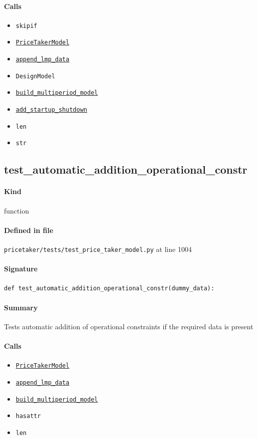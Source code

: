 \documentclass[11pt]{report}
\begin{document}
\paragraph{Calls}
\begin{itemize}[leftmargin=*]
  \item \texttt{skipif}
  \item \hyperref[def:pricetaker-price_taker_model.py:PriceTakerModel:L161]{\texttt{PriceTakerModel}}
  \item \hyperref[def:pricetaker-price_taker_model.py:PriceTakerModel.append_lmp_data:L221]{\texttt{append\_lmp\_data}}
  \item \texttt{DesignModel}
  \item \hyperref[def:pricetaker-price_taker_model.py:PriceTakerModel.build_multiperiod_model:L291]{\texttt{build\_multiperiod\_model}}
  \item \hyperref[def:pricetaker-price_taker_model.py:PriceTakerModel.add_startup_shutdown:L813]{\texttt{add\_startup\_shutdown}}
  \item \texttt{len}
  \item \texttt{str}
\end{itemize}
\subsection{test\_automatic\_addition\_operational\_constr}
\label{def:pricetaker-tests-test_price_taker_model.py:test_automatic_addition_operational_constr:L1004}
\paragraph{Kind} function
\paragraph{Defined in file} \texttt{pricetaker/tests/test\_price\_taker\_model.py} at line 1004
\paragraph{Signature} \texttt{def test\_automatic\_addition\_operational\_constr(dummy\_data):}
\paragraph{Summary} Tests automatic addition of operational constraints if the required data is present
\paragraph{Calls}
\begin{itemize}[leftmargin=*]
  \item \hyperref[def:pricetaker-price_taker_model.py:PriceTakerModel:L161]{\texttt{PriceTakerModel}}
  \item \hyperref[def:pricetaker-price_taker_model.py:PriceTakerModel.append_lmp_data:L221]{\texttt{append\_lmp\_data}}
  \item \hyperref[def:pricetaker-price_taker_model.py:PriceTakerModel.build_multiperiod_model:L291]{\texttt{build\_multiperiod\_model}}
  \item \texttt{hasattr}
  \item \texttt{len}
\end{itemize}
\end{document}
